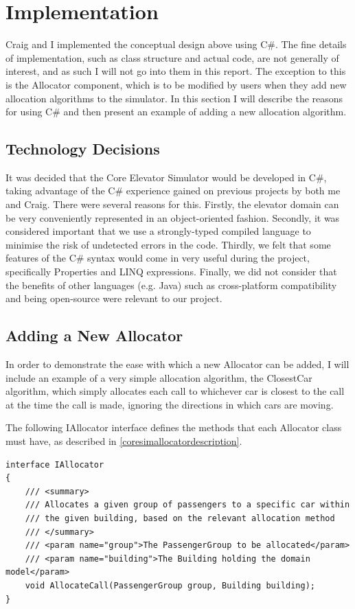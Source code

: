 \documentclass{UoYCSproject}
\begin{document}
\section{Implementation}

Craig and I implemented the conceptual design above using C\#.  The fine details of implementation, such as class structure and actual code, are not generally of interest, and as such I will not go into them in this report.  The exception to this is the Allocator component, which is to be modified by users when they add new allocation algorithms to the simulator.  In this section I will describe the reasons for using C\# and then present an example of adding a new allocation algorithm.

\subsection{Technology Decisions}

It was decided that the Core Elevator Simulator would be developed in C\#, taking advantage of the C\# experience gained on previous projects by both me and Craig.  There were several reasons for this.  Firstly, the elevator domain can be very conveniently represented in an object-oriented fashion.  Secondly, it was considered important that we use a strongly-typed compiled language to minimise the risk of undetected errors in the code.  Thirdly, we felt that some features of the C\# syntax would come in very useful during the project, specifically Properties and LINQ expressions.  Finally, we did not consider that the benefits of other languages (e.g. Java) such as cross-platform compatibility and being open-source were relevant to our project.

\subsection{Adding a New Allocator}

In order to demonstrate the ease with which a new Allocator can be added, I will include an example of a very simple allocation algorithm, the ClosestCar algorithm, which simply allocates each call to whichever car is closest to the call at the time the call is made, ignoring the directions in which cars are moving.

The following IAllocator interface defines the methods that each Allocator class must have, as described in \autoref{coresimallocatordescription}.

\lstset{language=[Sharp]C, basicstyle=\ttfamily\tiny, breaklines=true, breakatwhitespace=true }
\begin{lstlisting}
interface IAllocator
{
	/// <summary>
	/// Allocates a given group of passengers to a specific car within
	/// the given building, based on the relevant allocation method
	/// </summary>
	/// <param name="group">The PassengerGroup to be allocated</param>
	/// <param name="building">The Building holding the domain model</param>
	void AllocateCall(PassengerGroup group, Building building);
}
\end{lstlisting}
\end{document}
